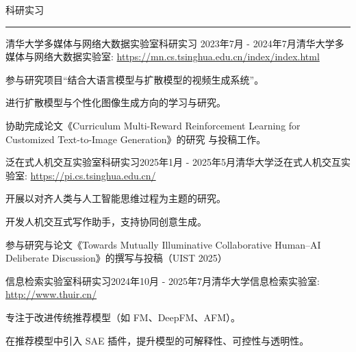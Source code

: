 \documentclass{resume} %
\renewenvironment{rSection}[1]{
\sectionskip
\textcolor{TsinghuaPurple}{\MakeUppercase{#1}}
\sectionlineskip
\hrule
\begin{list}{}{
\setlength{\leftmargin}{0em}
}
\item[]
}{
\end{list}
}
\begin{document}
\begin{rSection}{科研实习}

\begin{rSubsection}{清华大学多媒体与网络大数据实验室科研实习 }{2023年7月 - 2024年7月}{清华大学多媒体与网络大数据实验室: \url{https://mn.cs.tsinghua.edu.cn/index/index.html}}{}              
\item 参与研究项目“结合大语言模型与扩散模型的视频生成系统”。
\item 进行扩散模型与个性化图像生成方向的学习与研究。
\item 协助完成论文《Curriculum Multi-Reward Reinforcement Learning for Customized Text-to-Image Generation》的研究
与投稿工作。
\end{rSubsection}  

\begin{rSubsection}{泛在式人机交互实验室科研实习}{2025年1月 - 2025年5月}{清华大学泛在式人机交互实验室: \url{https://pi.cs.tsinghua.edu.cn/}}{}              
\item 开展以对齐人类与人工智能思维过程为主题的研究。
\item 开发人机交互式写作助手，支持协同创意生成。
\item 参与研究与论文《Towards Mutually Illuminative Collaborative Human–AI Deliberate Discussion》的撰写与投稿（UIST 2025）
\end{rSubsection}  

\begin{rSubsection}{信息检索实验室科研实习}{2024年10月 - 2025年7月}{清华大学信息检索实验室: \url{http://www.thuir.cn/}}{}              
\item 专注于改进传统推荐模型（如 FM、DeepFM、AFM）。
\item 在推荐模型中引入 SAE 插件，提升模型的可解释性、可控性与透明性。
\end{rSubsection}  

\end{rSection}

\end{document}
